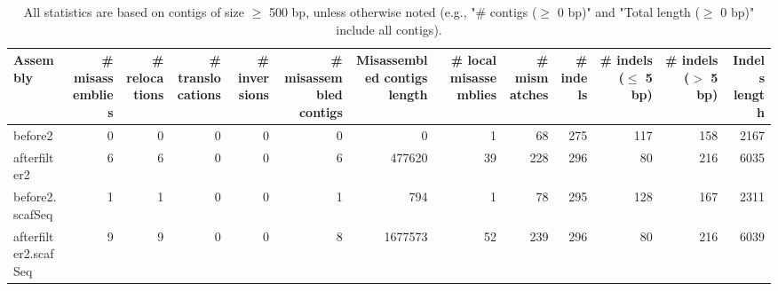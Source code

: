 \documentclass[12pt,a4paper]{article}
\begin{document}
\begin{table}[ht]
\begin{center}
\caption{All statistics are based on contigs of size $\geq$ 500 bp, unless otherwise noted (e.g., "\# contigs ($\geq$ 0 bp)" and "Total length ($\geq$ 0 bp)" include all contigs).}
\begin{tabular}{|l*{12}{|r}|}
\hline
Assembly & \# misassemblies &     \# relocations &     \# translocations &     \# inversions & \# misassembled contigs & Misassembled contigs length & \# local misassemblies & \# mismatches & \# indels &     \# indels ($\leq$ 5 bp) &     \# indels ($>$ 5 bp) & Indels length \\ \hline
before2 & 0 & 0 & 0 & 0 & 0 & 0 & 1 & 68 & 275 & 117 & 158 & 2167 \\ \hline
afterfilter2 & 6 & 6 & 0 & 0 & 6 & 477620 & 39 & 228 & 296 & 80 & 216 & 6035 \\ \hline
before2.scafSeq & 1 & 1 & 0 & 0 & 1 & 794 & 1 & 78 & 295 & 128 & 167 & 2311 \\ \hline
afterfilter2.scafSeq & 9 & 9 & 0 & 0 & 8 & 1677573 & 52 & 239 & 296 & 80 & 216 & 6039 \\ \hline
\end{tabular}
\end{center}
\end{table}
\end{document}
